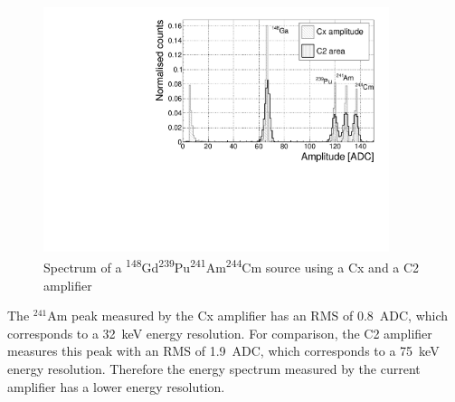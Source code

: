 \documentclass[12pt]{packages/mytustyle}  %
\begin{document}
\begin{figure}[!t]
\centering
\includegraphics[width=0.9\textwidth]{../../scripts/05_current_monitoring/plot4alpha/plots/4alphaCompare}
\caption{Spectrum of a \textsuperscript{148}Gd\textsuperscript{239}Pu\textsuperscript{241}Am\textsuperscript{244}Cm source using a Cx and a C2 amplifier}
\label{fig:c2cx4alpha}
\end{figure}
The $^{241}$Am peak measured by the Cx amplifier has an RMS of 0.8~ADC, which corresponds to a 32~keV energy resolution. For comparison, the C2 amplifier measures this peak with an RMS of 1.9~ADC, which corresponds to a 75~keV energy resolution. Therefore the energy spectrum measured by the current amplifier has a lower energy resolution.









\end{document}
